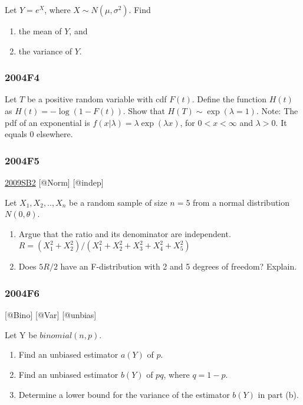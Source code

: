 \documentclass[6pt,Portrait]{article}
\begin{document}
Let \(Y=e^X\), where \(X\sim N(\mu,\sigma^2)\). Find

\begin{enumerate}
\def\labelenumi{(\alph{enumi})}
\item
  the mean of \(Y\), and
\item
  the variance of \(Y\).
\end{enumerate}

\hypertarget{f4-2}{%
\subsubsection{2004F4}\label{f4-2}}

Let \(T\) be a positive random variable with cdf \(F(t)\). Define the
function \(H(t)\) as \(H(t)=-\log(1-F(t))\). Show that
\(H (T)\sim\exp(\lambda=1)\). Note: The pdf of an exponential is
\(f(x|\lambda)=\lambda\exp(\lambda x)\), for \(0<x<\infty\) and
\(\lambda>0\). It equals 0 elsewhere.

\hypertarget{f5-2}{%
\subsubsection{2004F5}\label{f5-2}}

\protect\hyperlink{sb2}{2009SB2} {[}@Norm{]} {[}@indep{]}

Let \(X_1,X_2,..,X_n\) be a random sample of size \(n=5\) from a normal
distribution \(N(0,\theta)\).

\begin{enumerate}
\def\labelenumi{(\alph{enumi})}
\item
  Argue that the ratio and its denominator are independent.
  \(R=(X_1^2+ X_2^2)/(X_1^2+ X_2^2+X_3^2+ X_4^2+X_5^2)\)
\item
  Does \(5R/2\) have an F-distribution with 2 and 5 degrees of freedom?
  Explain.
\end{enumerate}

\hypertarget{f6-2}{%
\subsubsection{2004F6}\label{f6-2}}

{[}@Bino{]} {[}@Var{]} {[}@unbias{]}

Let Y be \(binomial(n,p)\).

\begin{enumerate}
\def\labelenumi{(\alph{enumi})}
\item
  Find an unbiased estimator \(a(Y)\) of \(p\).
\item
  Find an unbiased estimator \(b(Y)\) of \(pq\), where \(q=1-p\).
\item
  Determine a lower bound for the variance of the estimator \(b(Y)\) in
  part (b).
\end{enumerate}
\end{document}
